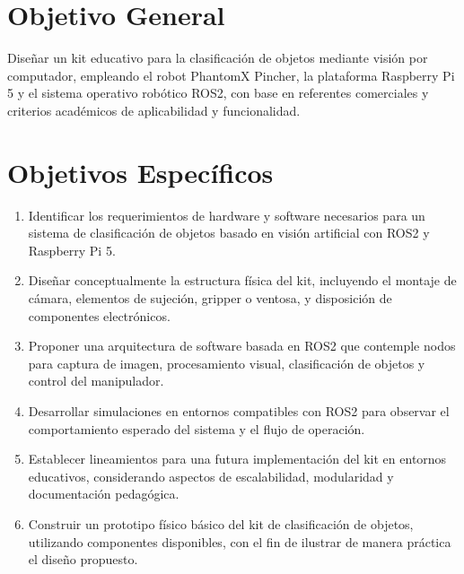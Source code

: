 \section{Objetivo General}

Diseñar un kit educativo para la clasificación de objetos mediante visión por computador, empleando el robot PhantomX Pincher, la plataforma Raspberry Pi 5 y el sistema operativo robótico ROS2, con base en referentes comerciales y criterios académicos de aplicabilidad y funcionalidad.

\section{Objetivos Específicos}

\begin{enumerate}
    \item Identificar los requerimientos de hardware y software necesarios para un sistema de clasificación de objetos basado en visión artificial con ROS2 y Raspberry Pi 5.
    
    \item Diseñar conceptualmente la estructura física del kit, incluyendo el montaje de cámara, elementos de sujeción, gripper o ventosa, y disposición de componentes electrónicos.
    
    \item Proponer una arquitectura de software basada en ROS2 que contemple nodos para captura de imagen, procesamiento visual, clasificación de objetos y control del manipulador.
    
    \item Desarrollar simulaciones en entornos compatibles con ROS2 para observar el comportamiento esperado del sistema y el flujo de operación.
    
    \item Establecer lineamientos para una futura implementación del kit en entornos educativos, considerando aspectos de escalabilidad, modularidad y documentación pedagógica.
    
    \item Construir un prototipo físico básico del kit de clasificación de objetos, utilizando componentes disponibles, con el fin de ilustrar de manera práctica el diseño propuesto.
\end{enumerate}
